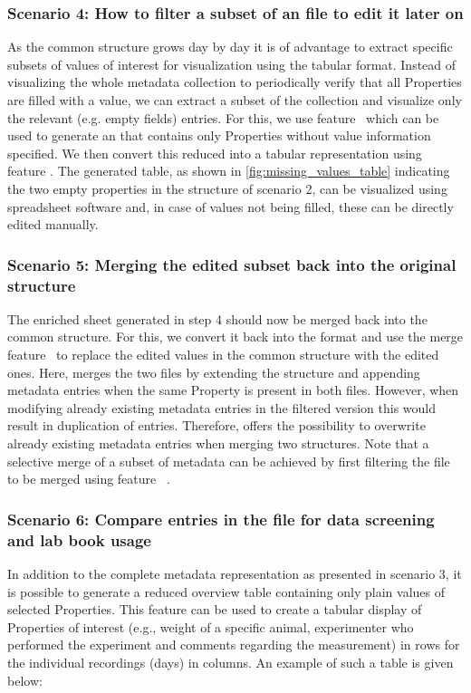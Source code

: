 \subsubsection*{Scenario 4: How to filter a subset of an  file to edit it later on}
As the common  structure grows day by day it is of advantage to extract specific subsets of  values of interest for visualization using the tabular format. Instead of visualizing the whole metadata collection to periodically verify that all Properties are filled with a value, we can extract a subset of the collection and visualize only the relevant (e.g. empty fields) entries. For this, we use  feature \ffilter\ which can be used to generate an  that contains only Properties without value information specified. We then convert this reduced  into a tabular  representation using  feature \fconvert. The generated table, as shown in \cref{fig:missing_values_table} indicating the two empty properties in the  structure of scenario 2, can be visualized using spreadsheet software and, in case of values not being filled, these can be directly edited manually.

\subsubsection*{Scenario 5: Merging the edited subset back into the original structure}
The enriched  sheet generated in step 4 should now be merged back into the common  structure. For this, we convert it back into the  format and use the  merge feature \fmerge\ to replace the edited values in the common  structure with the edited ones. Here,  merges the two  files by extending the  structure and appending metadata entries when the same Property is present in both files. However, when modifying already existing metadata entries in the filtered version this would result in duplication of entries. Therefore,  offers the possibility to overwrite already existing metadata entries when merging two  structures. Note that a selective merge of a subset of metadata can be achieved by first filtering the file to be merged using feature \ffilter\ . 


\subsubsection*{Scenario 6: Compare entries in the  file for data screening and lab book usage}
In addition to the complete metadata representation as presented in scenario 3, it is possible to generate a reduced overview table containing only plain values of selected Properties. This feature can be used to create a tabular display of Properties of interest (e.g., weight of a specific animal, experimenter who performed the experiment and comments regarding the measurement) in rows for the individual recordings (days) in columns. An example of such a table is given below:

